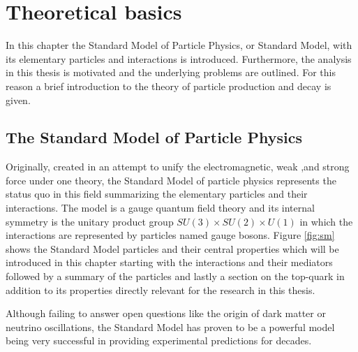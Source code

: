 
\chapter{Theoretical basics}

In this chapter the Standard Model of Particle Physics, or Standard Model, with its elementary particles and interactions is introduced.
Furthermore, the analysis in this thesis is motivated and the underlying problems are outlined. For this reason a brief introduction to the theory of particle production and decay is given.


\section{The Standard Model of Particle Physics}
\label{sec:sm}

Originally, created in an attempt to unify the electromagnetic, weak ,and strong force under one theory, the Standard Model of particle physics represents the status quo in this field summarizing the elementary particles and their interactions.
The model is a gauge quantum field theory and its internal symmetry is the unitary product group $SU(3) \times SU(2) \times U(1)$ in which the interactions are represented by particles named gauge bosons.
Figure \ref{fig:sm} shows the Standard Model particles and their central properties which will be introduced in this chapter starting with the interactions and their mediators followed by a summary of the particles and lastly a section on the top-quark in addition to its properties directly relevant for the research in this thesis.

Although failing to answer open questions like the origin of dark matter or neutrino oscillations, the Standard Model has proven to be a powerful model being very successful in providing experimental predictions for decades.

